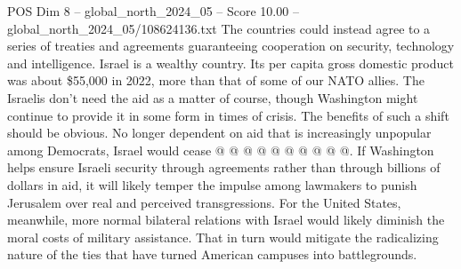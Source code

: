 \begin{textsample}{POS Dim 8 – global\_north\_2024\_05 – Score 10.00 – global\_north\_2024\_05/108624136.txt}
The countries could instead agree to a series of treaties and agreements guaranteeing cooperation on security, technology and intelligence.
Israel is a wealthy country.
Its per capita gross domestic product was about \$55,000 in 2022, more than that of some of our NATO allies.
The Israelis don't need the aid as a matter of course, though Washington might continue to provide it in some form in times of crisis.
The benefits of such a shift should be obvious.
No longer dependent on aid that is increasingly unpopular among Democrats, Israel would cease @ @ @ @ @ @ @ @ @ @.
If Washington helps ensure Israeli security through agreements rather than through billions of dollars in aid, it will likely temper the impulse among lawmakers to punish Jerusalem over real and perceived transgressions.
For the United States, meanwhile, more normal bilateral relations with Israel would likely diminish the moral costs of military assistance.
That in turn would mitigate the radicalizing nature of the ties that have turned American campuses into battlegrounds.

\end{textsample}
